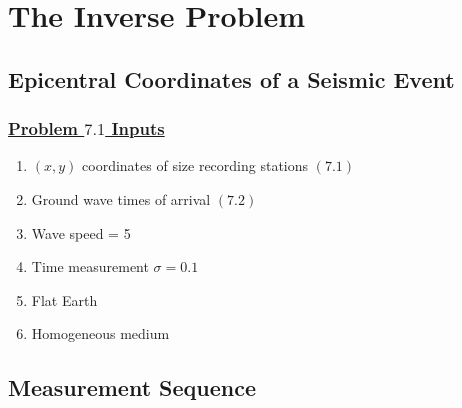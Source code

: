 % 

\newcommand{\urlTarantola}[0]		{https://epubs.siam.org/doi/book/10.1137/1.9780898717921}

\section{The Inverse Problem}

\subsection{Epicentral Coordinates of a Seismic Event}
%
\begin{frame}\frametitle{\href{\urlTarantola}{Problem $7.1$ Inputs}}
\begin{enumerate}
	\item $(x,y)$ coordinates of size recording stations $(7.1)$
	\item Ground wave times of arrival $(7.2)$
	\item Wave speed = 5
	\item Time measurement $\sigma=0.1$
	\item Flat Earth
	\item Homogeneous medium
\end{enumerate}
\end{frame}
%
\subsection{Measurement Sequence}

